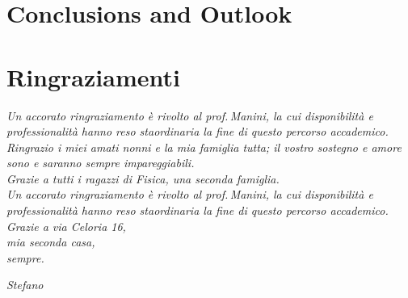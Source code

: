 \documentclass[12pt,a4paper, openright, twoside]{report}
\begin{document}
\chapter{Conclusions and Outlook}


\printbibliography

\chapter*{Ringraziamenti}

\textit{Un accorato ringraziamento è rivolto al prof.\,Manini, la cui disponibilità e professionalità hanno reso staordinaria la fine di questo percorso accademico.}
\\
    \textit{Ringrazio i miei amati nonni e la mia famiglia tutta; il vostro sostegno e amore sono e saranno sempre impareggiabili.}
    \\
    \textit{Grazie a tutti i ragazzi di Fisica, una seconda famiglia.}
    \\
    \textit{Un accorato ringraziamento è rivolto al prof.\,Manini, la cui disponibilità e professionalità hanno reso staordinaria la fine di questo percorso accademico.}
    \vspace{1cm}
    \\
    \textit{Grazie a via Celoria 16, 
    \\
    mia seconda casa, 
    \\
    sempre.}
    \vspace{0.5cm}
    \\
    \begin{flushright}
        \textit{Stefano}
    \end{flushright}
\end{document}
